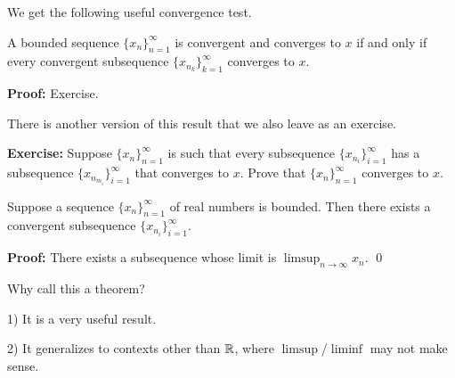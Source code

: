 \documentclass[10pt,aspectratio=169]{beamer}
\begin{document}
\begin{frame}

We get the following useful convergence test.

\begin{proposition}
A bounded sequence $\{ x_n \}_{n=1}^\infty$ is convergent and converges to $x$
if and only if
every convergent subsequence
$\{ x_{n_k} \}_{k=1}^\infty$ converges to $x$.
\end{proposition}

\pause
\textbf{Proof:} Exercise.

\pause
\medskip

There is another version of this result that we also leave as an exercise.

\medskip

\textbf{Exercise:}
Suppose $\{ x_n \}_{n=1}^\infty$ is such that every subsequence
$\{ x_{n_i} \}_{i=1}^\infty$ has a subsequence
$\{ x_{n_{m_i}} \}_{i=1}^\infty$ that converges to $x$.
Prove that $\{ x_n \}_{n=1}^\infty$ converges to $x$.

\end{frame}

\begin{frame}

\begin{theorem}
Suppose a sequence $\{ x_n \}_{n=1}^\infty$ of real numbers is bounded.
Then there exists a convergent subsequence $\{ x_{n_i} \}_{i=1}^\infty$.
\end{theorem}

\pause
\textbf{Proof:}
There exists a subsequence whose limit is $\displaystyle \limsup_{n\to\infty} x_n$.
\qed

\pause
\medskip

Why call this a theorem?

\pause
\medskip

1) It is a very useful result.

\pause
\medskip

2) It generalizes to contexts other than ${\mathbb{R}}$, where
$\limsup$/$\liminf$ may not make sense.


\end{frame}
\end{document}
